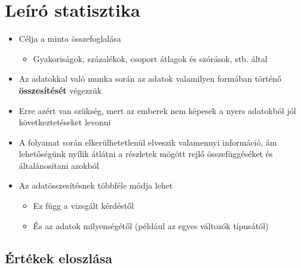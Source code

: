 \documentclass[
  letterpaper,
  DIV=11,
  numbers=noendperiod]{scrreprt}
\providecommand{\tightlist}{%
  \setlength{\itemsep}{0pt}\setlength{\parskip}{0pt}}\usepackage{longtable,booktabs,array}
\begin{document}

\hypertarget{leuxedruxf3-statisztika}{%
\chapter{Leíró statisztika}\label{leuxedruxf3-statisztika}}

\begin{itemize}
\item
  Célja a minta összefoglalása

  \begin{itemize}
  \tightlist
  \item
    Gyakoriságok, százalékok, csoport átlagok és szórások, stb. által
  \end{itemize}
\item
  Az adatokkal való munka során az adatok valamilyen formában történő
  \textbf{összesítését} végezzük
\item
  Erre azért van szükség, mert az emberek nem képesek a nyers adatokból
  jól következtetéseket levonni
\item
  A folyamat során elkerülhetetlenül elveszik valamennyi információ, ám
  lehetőségünk nyílik átlátni a részletek mögött rejlő összefüggéséket
  és általánosítani azokból
\item
  Az adatösszesítésnek többféle módja lehet

  \begin{itemize}
  \item
    Ez függ a vizsgált kérdéstől
  \item
    És az adatok milyenségétől (például az egyes változók típusától)
  \end{itemize}
\end{itemize}

\hypertarget{uxe9rtuxe9kek-eloszluxe1sa}{%
\section{Értékek eloszlása}\label{uxe9rtuxe9kek-eloszluxe1sa}}
\end{document}
